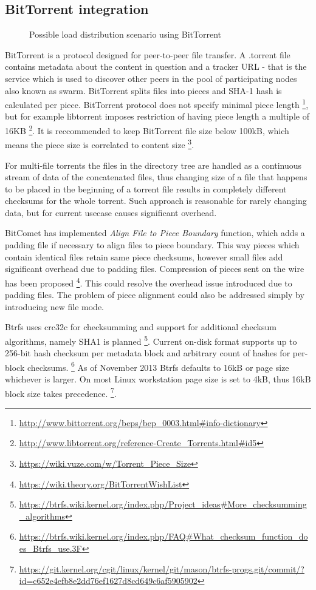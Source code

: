 \documentclass{article}
\begin{document}
\subsection{BitTorrent integration}


\begin{figure}[!htb]
\centering
\scalebox{0.5}{}
\caption{Possible load distribution scenario using BitTorrent}
\label{fig:digraph}
\end{figure}

BitTorrent is a protocol designed for peer-to-peer file transfer.
A .torrent file contains metadata about the content in question and a
tracker URL - that is the service which is used to discover other peers in the
pool of participating nodes also known as swarm.
BitTorrent splits files into pieces and SHA-1 hash is calculated per piece.
BitTorrent protocol does not specify minimal piece length
\footnote{\url{http://www.bittorrent.org/beps/bep_0003.html#info-dictionary}},
but for example libtorrent imposes restriction of having piece length
a multiple of 16KB
\footnote{\url{http://www.libtorrent.org/reference-Create_Torrents.html#id5}}.
It is reccommended to keep BitTorrent file size below 100kB,
which means the piece size is correlated to content size
\footnote{\url{https://wiki.vuze.com/w/Torrent_Piece_Size}}.

For multi-file torrents the files in the directory tree are handled
as a continuous stream of data of the concatenated files,
thus changing size of a file that happens to be placed in the beginning of a torrent
file results in completely different checksums for the whole torrent.
Such approach is reasonable for rarely changing data, but for current usecase
causes significant overhead.

BitComet has implemented \emph{Align File to Piece Boundary} function,
which adds a padding file if necessary to align files to piece boundary.
This way pieces which contain identical files retain same piece checksums,
however small files add significant overhead due to padding files.
Compression of pieces sent on the wire has been proposed
\footnote{\url{https://wiki.theory.org/BitTorrentWishList}}.
This could resolve the overhead issue introduced due to padding files.
The problem of piece alignment could also be addressed
simply by introducing new file mode.

Btrfs uses crc32c for checksumming and support for additional
checksum algorithms, namely SHA1 is planned
\footnote{\url{https://btrfs.wiki.kernel.org/index.php/Project_ideas#More_checksumming_algorithms}}.
Current on-disk format supports up to 256-bit hash checksum per
metadata block and arbitrary count of hashes for per-block checksums.
\footnote{\url{https://btrfs.wiki.kernel.org/index.php/FAQ#What_checksum_function_does_Btrfs_use.3F}}
As of November 2013 Btrfs defaults to 16kB or page size
whichever is larger.
On most Linux workstation page size is set to 4kB, thus 16kB block
size takes precedence.
\footnote{\url{https://git.kernel.org/cgit/linux/kernel/git/mason/btrfs-progs.git/commit/?id=c652e4efb8e2dd76ef1627d8cd649c6af5905902}}.
\end{document}
